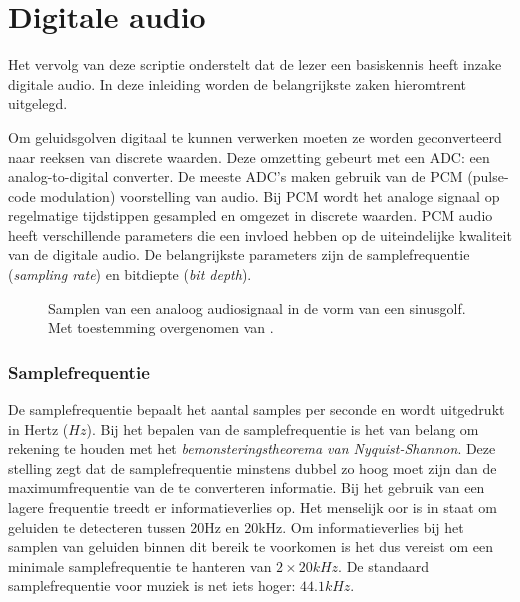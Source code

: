 \section{Digitale audio}

Het vervolg van deze scriptie onderstelt dat de lezer een basiskennis heeft inzake digitale audio. In deze inleiding worden de belangrijkste zaken hieromtrent uitgelegd.

Om geluidsgolven digitaal te kunnen verwerken moeten ze worden geconverteerd naar reeksen van discrete waarden. Deze omzetting gebeurt met een ADC: een analog-to-digital converter. De meeste ADC's maken gebruik van de PCM (pulse-code modulation) voorstelling van audio. Bij PCM wordt het analoge signaal op regelmatige tijdstippen gesampled en omgezet in discrete waarden. PCM audio heeft verschillende parameters die een invloed hebben op de uiteindelijke kwaliteit van de digitale audio. De belangrijkste parameters zijn de samplefrequentie (\textit{sampling rate}) en bitdiepte (\textit{bit depth}).

\begin{figure}[h!]
	\captionsetup{width=0.7\textwidth}
	\caption[Samplen van audio]{Samplen van een analoog audiosignaal in de vorm van een sinusgolf. Met toestemming overgenomen van \cite{tarsosmanual2016}.}
	\begin{center}
		\advance\parskip0.3cm
		
	\end{center}
\end{figure}

\subsubsection{Samplefrequentie}

De samplefrequentie bepaalt het aantal samples per seconde en wordt uitgedrukt in Hertz ($Hz$). Bij het bepalen van de samplefrequentie is het van belang om rekening te houden met het \textit{bemonsteringstheorema van Nyquist-Shannon}. Deze stelling zegt dat de samplefrequentie minstens dubbel zo hoog moet zijn dan de maximumfrequentie van de te converteren informatie. Bij het gebruik van een lagere frequentie treedt er informatieverlies op. Het menselijk oor is in staat om geluiden te detecteren tussen 20Hz en 20kHz. Om informatieverlies bij het samplen van geluiden binnen dit bereik te voorkomen is het dus vereist om een minimale samplefrequentie te hanteren van $ 2 \times 20kHz $. De standaard samplefrequentie voor muziek is net iets hoger: $ 44.1kHz $. 

